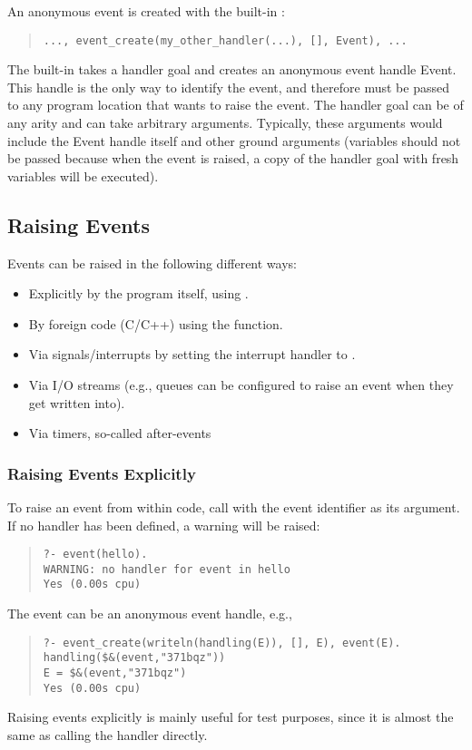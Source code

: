 An anonymous event is created with the built-in
:
\begin{quote}
\begin{verbatim}
..., event_create(my_other_handler(...), [], Event), ...
\end{verbatim}
\end{quote}
The built-in takes a handler goal and creates an anonymous event handle Event.
This handle is the only way to identify the event, and therefore must be
passed to any program location that wants to raise the event.
The handler goal can be of any arity and can take arbitrary arguments.
Typically, these arguments would include the Event handle itself and other
ground arguments (variables should not be passed because when the event
is raised, a copy of the handler goal with fresh variables will be executed).


\subsection{Raising Events}
Events can be raised in the following different ways:
\begin{itemize}
\item Explicitly by the {\eclipse} program itself, using
    .
\item By foreign code (C/C++) using the  function.
\item Via signals/interrupts by setting the interrupt handler to
    .
\item Via I/O streams (e.g., queues can be configured to raise an event
    when they get written into).
\item Via timers, so-called after-events
\end{itemize}

\subsubsection{Raising Events Explicitly}
To raise an event from within {\eclipse} code, call
 with the event
identifier as its argument. If no handler has been defined, a warning
will be raised:
\begin{quote}
\begin{verbatim}
?- event(hello).
WARNING: no handler for event in hello
Yes (0.00s cpu)
\end{verbatim}
\end{quote}
The event can be an anonymous event handle, e.g.,
\begin{quote}
\begin{verbatim}
?- event_create(writeln(handling(E)), [], E), event(E).
handling($&(event,"371bqz"))
E = $&(event,"371bqz")
Yes (0.00s cpu)
\end{verbatim}
\end{quote}
Raising events explicitly is mainly useful for test purposes, since
it is almost the same as calling the handler directly.

